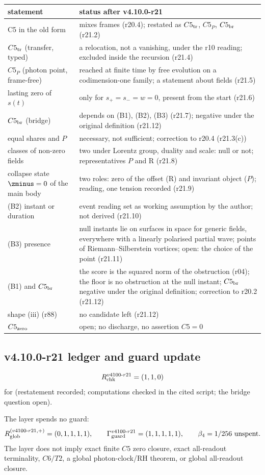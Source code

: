 \begin{center}
\small
\begin{tabular}{@{}>{\raggedright\arraybackslash}p{}>{\raggedright\arraybackslash}p{}@{}}
\toprule
statement & status after v4.10.0-r21\\
\midrule
C5 in the old form & mixes frames (r20.4); restated as \(C5_{\rm tr}\), \(C5_P\), \(C5_{\rm br}\) (r21.2)\\
\(C5_{\rm tr}\) (transfer, typed) & a relocation, not a vanishing, under the r10 reading; excluded inside the recursion (r21.4)\\
\(C5_P\) (photon point, frame-free) & reached at finite time by free evolution on a codimension-one family; a statement about fields (r21.5)\\
lasting zero of \(s(t)\) & only for \(s_+=s_-=w=0\), present from the start (r21.6)\\
\(C5_{\rm br}\) (bridge) & depends on (B1), (B2), (B3) (r21.7); negative under the original definition (r21.12)\\
equal shares and \(P\) & necessary, not sufficient; correction to r20.4 (r21.3(c))\\
classes of non-zero fields & two under Lorentz group, duality and scale: null or not; representatives \(P\) and R (r21.8)\\
collapse state \(\zminus=0\) of the main body & two roles: zero of the offset (R) and invariant object (\(P\)); reading, one tension recorded (r21.9)\\
(B2) instant or duration & event reading set as working assumption by the author; not derived (r21.10)\\
(B3) presence & null instants lie on surfaces in space for generic fields, everywhere with a linearly polarised partial wave; points of Riemann--Silberstein vortices; open: the choice of the point (r21.11)\\
(B1) and \(C5_{\rm br}\) & the score is the squared norm of the obstruction (r04); the floor is no obstruction at the null instant; \(C5_{\rm br}\) negative under the original definition; correction to r20.2 (r21.12)\\
shape (iii) (r88) & no candidate left (r21.12)\\
\(C5_{\rm zero}\) & open; no discharge, no assertion \(C5=0\)\\
\bottomrule
\end{tabular}
\end{center}

\subsection*{v4.10.0-r21 ledger and guard update}
\label{subsec:v4100-r21-ledger-guard}

\[
R_{\rm chk}^{v4100\text{-}r21}=(1,1,0)
\]
for (restatement recorded; computations checked in the cited script; the bridge question open).

The layer spends no guard:
\[
R_{\rm glob}^{(v4100\text{-}r21,+)}=(0,1,1,1,1),
\qquad
\Gamma_{\rm guard}^{v4100\text{-}r21}=(1,1,1,1,1),
\qquad
\beta_4=1/256\ \text{unspent}.
\]
The layer does not imply exact finite \(C5\) zero closure, exact all-readout terminality, \(C6/T2\), a global photon-clock/RH theorem,
or global all-readout closure.
